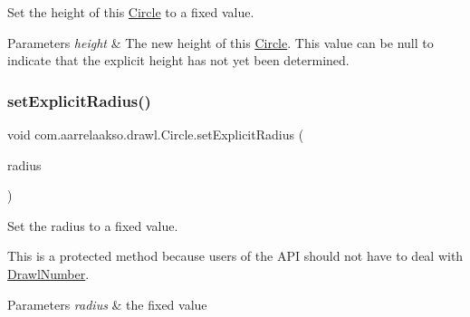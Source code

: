 Set the height of this \hyperlink{classcom_1_1aarrelaakso_1_1drawl_1_1_circle}{Circle} to a fixed value. 


\begin{DoxyParams}{Parameters}
{\em height} & The new height of this \hyperlink{classcom_1_1aarrelaakso_1_1drawl_1_1_circle}{Circle}. This value can be {\ttfamily null} to indicate that the explicit height has not yet been determined. \\
\hline
\end{DoxyParams}
\mbox{\label{classcom_1_1aarrelaakso_1_1drawl_1_1_circle_ab488257bdd425addecb822c45ed659ba}} 
\subsubsection{\texorpdfstring{set\+Explicit\+Radius()}{setExplicitRadius()}\hspace{0.1cm}{\footnotesize\ttfamily [1/2]}}
{\footnotesize\ttfamily void com.\+aarrelaakso.\+drawl.\+Circle.\+set\+Explicit\+Radius (\begin{DoxyParamCaption}\item[{@Not\+Null \hyperlink{classcom_1_1aarrelaakso_1_1drawl_1_1_drawl_number}{Drawl\+Number}}]{radius }\end{DoxyParamCaption})\hspace{0.3cm}{\ttfamily [protected]}}



Set the radius to a fixed value. 

This is a protected method because users of the A\+PI should not have to deal with \hyperlink{classcom_1_1aarrelaakso_1_1drawl_1_1_drawl_number}{Drawl\+Number}.


\begin{DoxyParams}{Parameters}
{\em radius} & the fixed value \\
\hline
\end{DoxyParams}
\mbox{\label{classcom_1_1aarrelaakso_1_1drawl_1_1_circle_af34a59acf0e1fc33777aca1b9be7b23d}} 
